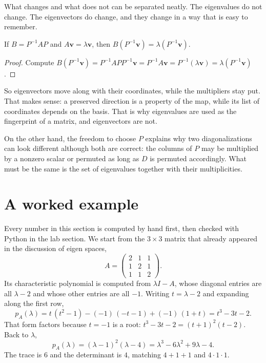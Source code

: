 What changes and what does not can be separated neatly. The eigenvalues do not change. The
eigenvectors do change, and they change in a way that is easy to remember.

\begin{proposisi}
If $B=P^{-1}AP$ and $A\mathbf{v}=\lambda\mathbf{v}$, then
$B(P^{-1}\mathbf{v})=\lambda(P^{-1}\mathbf{v})$.
\end{proposisi}

\begin{proof}
Compute $B(P^{-1}\mathbf{v})=P^{-1}APP^{-1}\mathbf{v}=P^{-1}A\mathbf{v}
=P^{-1}(\lambda\mathbf{v})=\lambda(P^{-1}\mathbf{v})$.
\end{proof}

So eigenvectors move along with their coordinates, while the multipliers stay put. That makes
sense: a preserved direction is a property of the map, while its list of coordinates depends on
the basis. That is why eigenvalues are used as the fingerprint of a matrix, and eigenvectors are
not.

On the other hand, the freedom to choose $P$ explains why two diagonalizations can look different
although both are correct: the columns of $P$ may be multiplied by a nonzero scalar or permuted as
long as $D$ is permuted accordingly. What must be the same is the set of eigenvalues together with
their multiplicities.

\section{A worked example}

Every number in this section is computed by hand first, then checked with Python in the lab
section. We start from the $3\times3$ matrix that already appeared in the discussion of eigen
spaces,
\[
  A=\begin{pmatrix}2&1&1\\ 1&2&1\\ 1&1&2\end{pmatrix}.
\]
Its characteristic polynomial is computed from $\lambda I-A$, whose diagonal entries are all
$\lambda-2$ and whose other entries are all $-1$. Writing $t=\lambda-2$ and expanding along the
first row,
\[
  p_{A}(\lambda)=t\,(t^{2}-1)-(-1)\,(-t-1)+(-1)\,(1+t)=t^{3}-3t-2 .
\]
That form factors because $t=-1$ is a root: $t^{3}-3t-2=(t+1)^{2}(t-2)$. Back to $\lambda$,
\[
  p_{A}(\lambda)=(\lambda-1)^{2}(\lambda-4)=\lambda^{3}-6\lambda^{2}+9\lambda-4 .
\]
The trace is $6$ and the determinant is $4$, matching $4+1+1$ and $4\cdot1\cdot1$.

